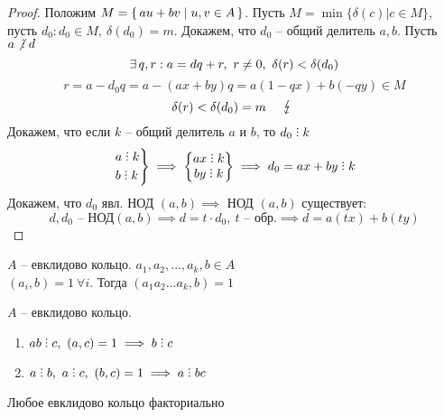 \begin{proof}
    Положим $ M = \set{ au + bv \mid u,v \in A } $. Пусть $ M = \min \bigg\{\delta(c) \bigg| c \in M \bigg\} $, пусть $ d_0 : d_0 \in M, ~ \delta(d_0) = m $. Докажем, что $ d_0 $ -- общий делитель $ a, b $. Пусть $ a \ndivby d $
    $$ \exists\, q,r : a = dq + r, ~ r \ne 0, ~ \delta(r) < \delta(d_0) $$
    $$ r = a - d_0 q = a - (ax + by) q = a(1-qx) + b(-qy) \in M $$
    $$ \delta(r) < \delta(d_0) = m \quad \contra $$
    Докажем, что если $k$ -- общий делитель $ a $ и $ b $, то $d_0 \divby k $
    $$ \begin{rcases} a \divby k \\ b \divby k \end{rcases} \implies \begin{Bmatrix} ax \divby k \\ by \divby k \end{Bmatrix} \implies d_0 = ax + by \divby k $$
    Докажем, что $ d_0 $ явл. НОД $ (a,b)  \implies $ НОД $ (a,b) $ существует:
    $$ d, d_0 \text{ -- НОД} (a,b) \implies d = t \cdot d_0, ~ t \text{ -- обр.} \implies d = a(tx) + b(ty) $$
\end{proof}

\begin{property}
	$A$ -- евклидово кольцо. $a_1, a_2, ..., a_k, b \in A $ \\ $ (a_i,b) = 1 ~ \forall i $. Тогда $ (a_1a_2...a_k, b) = 1 $
\end{property}

\begin{property}
	$A$ -- евклидово кольцо.
    \begin{enumerate}
    	\item $ ab \divby c, ~ (a,c) = 1 \implies b \divby c $
        \item $ a \divby b, ~ a \divby c, ~ (b,c) = 1 \implies a \divby bc $
    \end{enumerate}
\end{property}

\begin{theorem}
	Любое евклидово кольцо факториально
\end{theorem}

